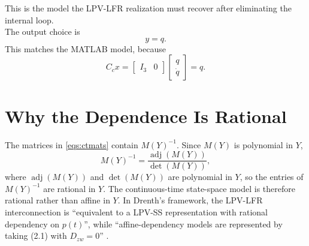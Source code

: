 \documentclass[11pt]{article}
\newcommand{\adj}{\operatorname{adj}}
\begin{document}
This is the model the LPV-LFR realization must recover after eliminating the internal loop.
\\
The output choice is
\begin{equation}
    y = q.
    \label{eqs:yq}
\end{equation}
This matches the MATLAB model, because
\begin{equation}
    C_c x
    =
    \begin{bmatrix} I_3 & 0 \end{bmatrix}
    \begin{bmatrix} q \\ \dot{q} \end{bmatrix}
    = q.
    \label{eqs:ccx}
\end{equation}

\section{Why the Dependence Is Rational}
The matrices in \eqref{eqs:ctmats} contain $M(Y)^{-1}$. Since $M(Y)$ is
polynomial in $Y$,
\begin{equation}
    M(Y)^{-1} = \frac{\adj(M(Y))}{\det(M(Y))},
    \label{eqs:adjdet}
\end{equation}
where $\adj(M(Y))$ and $\det(M(Y))$ are polynomial in $Y$, so the entries of
$M(Y)^{-1}$ are rational in $Y$. The continuous-time state-space model is therefore rational rather than affine
in $Y$. In Drenth's framework, the LPV-LFR interconnection is “equivalent to a
LPV-SS representation with rational dependency on $p(t)$”, while
“affine-dependency models are represented by taking (2.1) with $D_{zw}=0$”
\cite{drenth2025thesis}.
\end{document}

